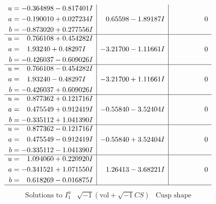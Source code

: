\documentclass[1p]{elsarticle_modified}
\theoremstyle{definition}
\newcommand{\I}{\sqrt{-1}}
\begin{document}
$$\begin{array}{c|c|c}
\begin{aligned}
u &= -0.364898 - 0.817401 I \\
a &= -0.190010 + 0.027234 I \\
b &= -0.873020 + 0.277556 I\end{aligned}
 & \phantom{-}0.65598 - 1.89187 I & \phantom{-0.000000 } 0 \\ \hline\begin{aligned}
u &= \phantom{-}0.766108 + 0.454282 I \\
a &= \phantom{-}1.93240 + 0.48297 I \\
b &= -0.426037 - 0.609026 I\end{aligned}
 & -3.21700 - 1.11661 I & \phantom{-0.000000 } 0 \\ \hline\begin{aligned}
u &= \phantom{-}0.766108 - 0.454282 I \\
a &= \phantom{-}1.93240 - 0.48297 I \\
b &= -0.426037 + 0.609026 I\end{aligned}
 & -3.21700 + 1.11661 I & \phantom{-0.000000 } 0 \\ \hline\begin{aligned}
u &= \phantom{-}0.877362 + 0.121716 I \\
a &= \phantom{-}0.475549 + 0.912419 I \\
b &= -0.335112 + 1.041390 I\end{aligned}
 & -0.55840 - 3.52404 I & \phantom{-0.000000 } 0 \\ \hline\begin{aligned}
u &= \phantom{-}0.877362 - 0.121716 I \\
a &= \phantom{-}0.475549 - 0.912419 I \\
b &= -0.335112 - 1.041390 I\end{aligned}
 & -0.55840 + 3.52404 I & \phantom{-0.000000 } 0 \\ \hline\begin{aligned}
u &= \phantom{-}1.094060 + 0.220920 I \\
a &= -0.341521 + 1.071550 I \\
b &= \phantom{-}0.618269 - 0.016875 I\end{aligned}
 & \phantom{-}1.26413 - 3.68221 I & \phantom{-0.000000 } 0\\
 \hline 
 \end{array}$$\newpage$$\begin{array}{c|c|c}  
\text{Solutions to }I^u_{1}& \I (\text{vol} + \sqrt{-1}CS) & \text{Cusp shape}\\
 \hline 
\begin{aligned}

\end{aligned}
\end{array}$$
\end{document}
